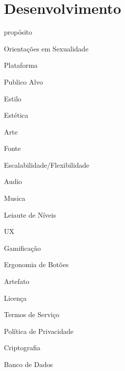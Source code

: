 \chapter{Desenvolvimento}\label{ch:Desenvolvimento}



propósito

Orientações em Sexualidade

Plataforma

Publico Alvo

Estilo

Estética

Arte

Fonte

Escalabilidade/Flexibilidade

Audio

Musica

Leiaute de Níveis

UX

Gamificação

Ergonomia de Botões

Artefato

Licença

Termos de Serviço

Política de Privacidade

Criptografia

Banco de Dados







